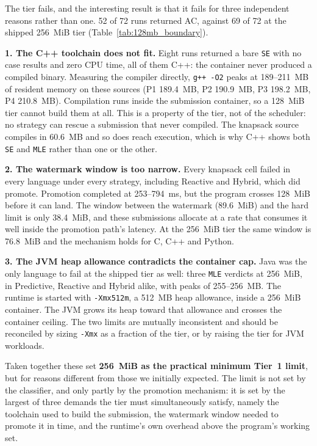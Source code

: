 \documentclass[conference]{IEEEtran}
\begin{document}
The tier fails, and the interesting result is that it fails for three independent reasons rather than one. 52 of 72 runs returned AC, against 69 of 72 at the shipped 256~MiB tier (Table~\ref{tab:128mb_boundary}).

\textbf{1. The C++ toolchain does not fit.} Eight runs returned a bare \texttt{SE} with no case results and zero CPU time, all of them C++: the container never produced a compiled binary. Measuring the compiler directly, \texttt{g++ -O2} peaks at 189--211~MB of resident memory on these sources (P1 189.4~MB, P2 190.9~MB, P3 198.2~MB, P4 210.8~MB). Compilation runs inside the submission container, so a 128~MiB tier cannot build them at all. This is a property of the tier, not of the scheduler: no strategy can rescue a submission that never compiled. The knapsack source compiles in 60.6~MB and so does reach execution, which is why C++ shows both \texttt{SE} and \texttt{MLE} rather than one or the other.

\textbf{2. The watermark window is too narrow.} Every knapsack cell failed in every language under every strategy, including Reactive and Hybrid, which did promote. Promotion completed at 253--794~ms, but the program crosses 128~MiB before it can land. The window between the watermark (89.6~MiB) and the hard limit is only 38.4~MiB, and these submissions allocate at a rate that consumes it well inside the promotion path's latency. At the 256~MiB tier the same window is 76.8~MiB and the mechanism holds for C, C++ and Python.

\textbf{3. The JVM heap allowance contradicts the container cap.} Java was the only language to fail at the shipped tier as well: three \texttt{MLE} verdicts at 256~MiB, in Predictive, Reactive and Hybrid alike, with peaks of 255--256~MB. The runtime is started with \texttt{-Xmx512m}, a 512~MB heap allowance, inside a 256~MiB container. The JVM grows its heap toward that allowance and crosses the container ceiling. The two limits are mutually inconsistent and should be reconciled by sizing \texttt{-Xmx} as a fraction of the tier, or by raising the tier for JVM workloads.

Taken together these set \textbf{256~MiB as the practical minimum Tier~1 limit}, but for reasons different from those we initially expected. The limit is not set by the classifier, and only partly by the promotion mechanism: it is set by the largest of three demands the tier must simultaneously satisfy, namely the toolchain used to build the submission, the watermark window needed to promote it in time, and the runtime's own overhead above the program's working set.
\end{document}
